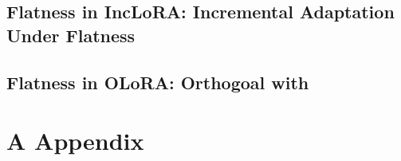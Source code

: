\documentclass[letterpaper]{article} %
\begin{document}



\subsection{Flatness in IncLoRA: Incremental Adaptation Under Flatness}


\subsection{Flatness in OLoRA: Orthogoal with }







\appendix

\section{A Appendix}
\end{document}
